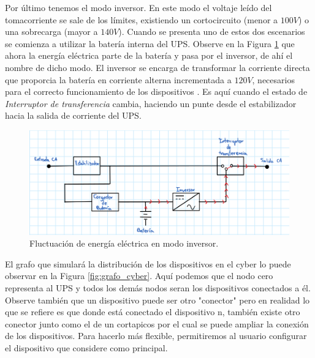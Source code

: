 \documentclass[runningheads]{llncs}
\begin{document}
        Por último tenemos el modo inversor. En este modo el voltaje leído del tomacorriente se sale de los límites, existiendo un cortocircuito (menor a $ 100 V $) o una sobrecarga (mayor a $ 140 V $). Cuando se presenta uno de estos dos escenarios se comienza a utilizar la batería interna del UPS. Observe en la Figura \ref{fig:ups_modo_inversor} que ahora la energía eléctrica parte de la batería y pasa por el inversor, de ahí el nombre de dicho modo. El inversor se encarga de transformar la corriente directa que proporcia la batería en corriente alterna incrementada a $ 120 V $, necesarios para el correcto funcionamiento de los dispositivos \cite{inversor}. Es aquí cuando el estado de \emph{Interruptor de transferencia} cambia, haciendo un punte desde el estabilizador hacia la salida de corriente del UPS.
        
        \begin{figure}[H]
            \centering
            \includegraphics[width=\textwidth]{ups_modo_inversor}
            \caption{Fluctuación de energía eléctrica en modo inversor.}
            \label{fig:ups_modo_inversor}
        \end{figure}
        
        El grafo que simulará la distribución de los dispositivos en el cyber lo puede observar en la Figura \ref{fig:grafo_cyber}. Aquí podemos que el nodo cero representa al UPS y todos los demás nodos seran los dispositivos conectados a él. Observe también que un dispositivo puede ser otro "conector" pero en realidad lo que se refiere es que donde está conectado el dispositivo n, también existe otro conector junto como el de un cortapicos por el cual se puede ampliar la conexión de los dispositivos. Para hacerlo más flexible, permitiremos al usuario configurar el dispositivo que considere como principal.
        
\end{document}
